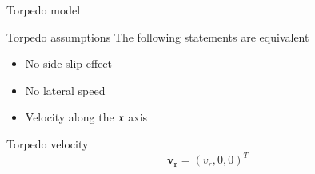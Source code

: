 \documentclass[10pt, xcolor={usenames, dvipsnames}]{beamer}
\begin{document}
        \begin{frame}{Torpedo model}
            \centering
            \begin{minipage}{0.7\textwidth}
                \begin{block}{Torpedo assumptions}
                    The following statements are equivalent
                    \begin{itemize}
                        \item No side slip effect \\
                        \item No lateral speed
                        \item Velocity along the $\mathnormal{x}$ axis \\
                    \end{itemize}
                \end{block}
                \begin{block}{Torpedo velocity}
                    \begin{equation}
                        \mathbf{v_r} = (v_r, 0, 0)^T
                    \end{equation}
                \end{block}
            \end{minipage}
        \end{frame}
\end{document}
